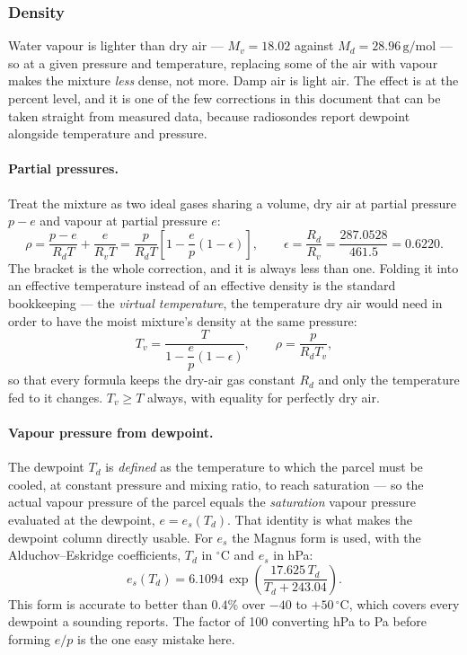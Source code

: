 \subsubsection{Density}\label{sec:density}
Water vapour is lighter than dry air --- $M_v=18.02$ against $M_d=28.96\,\mathrm{g/mol}$ --- so at
a given pressure and temperature, replacing some of the air with vapour makes the mixture
\emph{less} dense, not more. Damp air is light air. The effect is at the percent level, and it is
one of the few corrections in this document that can be taken straight from measured data, because
radiosondes report dewpoint alongside temperature and pressure.

\paragraph{Partial pressures.} Treat the mixture as two ideal gases sharing a volume, dry air at
partial pressure $p-e$ and vapour at partial pressure $e$:
\begin{equation}
    \rho = \frac{p-e}{R_dT} + \frac{e}{R_vT}
         = \frac{p}{R_dT}\left[1 - \frac{e}{p}\left(1 - \epsilon\right)\right], \qquad
    \epsilon = \frac{R_d}{R_v} = \frac{287.0528}{461.5} = 0.6220.
\end{equation}
The bracket is the whole correction, and it is always less than one. Folding it into an effective
temperature instead of an effective density is the standard bookkeeping --- the \emph{virtual
temperature}, the temperature dry air would need in order to have the moist mixture's density at
the same pressure:
\begin{equation} \label{eq:virtual_temperature}
    T_v = \frac{T}{1 - \dfrac{e}{p}\left(1-\epsilon\right)}, \qquad
    \rho = \frac{p}{R_dT_v},
\end{equation}
so that every formula keeps the dry-air gas constant $R_d$ and only the temperature fed to it
changes. $T_v \geq T$ always, with equality for perfectly dry air.

\paragraph{Vapour pressure from dewpoint.} The dewpoint $T_d$ is \emph{defined} as the temperature
to which the parcel must be cooled, at constant pressure and mixing ratio, to reach saturation ---
so the actual vapour pressure of the parcel equals the \emph{saturation} vapour pressure evaluated
at the dewpoint, $e=e_s(T_d)$. That identity is what makes the dewpoint column directly usable.
For $e_s$ the Magnus form is used, with the Alduchov--Eskridge coefficients, $T_d$ in
$^\circ\mathrm{C}$ and $e_s$ in hPa:
\begin{equation} \label{eq:magnus}
    e_s(T_d) = 6.1094\,\exp\!\left(\frac{17.625\,T_d}{T_d + 243.04}\right).
\end{equation}
This form is accurate to better than $0.4\%$ over $-40$ to $+50\,^\circ\mathrm{C}$, which covers
every dewpoint a sounding reports. The factor of 100 converting hPa to Pa before forming $e/p$ is
the one easy mistake here.


